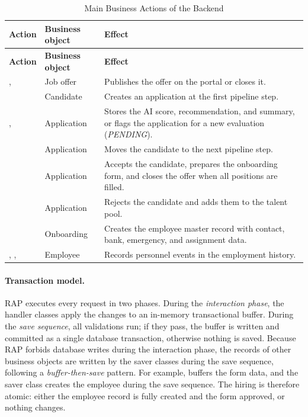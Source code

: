 \begingroup
\linespread{1}\selectfont
\renewcommand{\arraystretch}{1.4}
\begin{longtable}{@{}F{5.6cm}F{2.8cm}F{9.1cm}@{}}
\caption{Main Business Actions of the Backend}\label{tab:main_actions}\\
\toprule
\textbf{Action} & \textbf{Business object} & \textbf{Effect} \\
\midrule
\endfirsthead
\toprule
\textbf{Action} & \textbf{Business object} & \textbf{Effect} \\
\midrule
\endhead
\bottomrule
\endlastfoot
{},  & Job offer & Publishes the offer on the portal or closes it. \\
 & Candidate & Creates an application at the first pipeline step. \\
,  & Application & Stores the AI score, recommendation, and summary, or flags the application for a new evaluation (\emph{PENDING}). \\
 & Application & Moves the candidate to the next pipeline step. \\
 & Application & Accepts the candidate, prepares the onboarding form, and closes the offer when all positions are filled. \\
 & Application & Rejects the candidate and adds them to the talent pool. \\
 & Onboarding & Creates the employee master record with contact, bank, emergency, and assignment data. \\
, ,  & Employee & Records personnel events in the employment history. \\
\end{longtable}
\endgroup

\paragraph*{Transaction model.} RAP executes every request in two phases. During the \emph{interaction phase}, the handler classes apply the changes to an in-memory transactional buffer. During the \emph{save sequence}, all validations run; if they pass, the buffer is written and committed as a single database transaction, otherwise nothing is saved. Because RAP forbids database writes during the interaction phase, the records of other business objects are written by the saver classes during the save sequence, following a \emph{buffer-then-save} pattern. For example,  buffers the form data, and the saver class  creates the employee during the save sequence. The hiring is therefore atomic: either the employee record is fully created and the form approved, or nothing changes.

